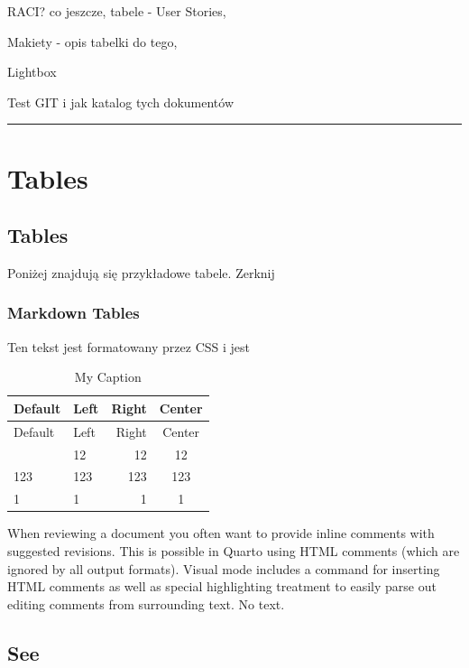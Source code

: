 \documentclass[
  a4paper,
  DIV=11,
  numbers=noendperiod,
  oneside,
  open=any]{scrreprt}
\begin{document}
RACI? co jeszcze, tabele - User Stories,

Makiety - opis tabelki do tego,

Lightbox

Test GIT i jak katalog tych dokumentów

\begin{center}\rule{0.5\linewidth}{0.5pt}\end{center}


\chapter{Tables}\label{tables}

\section{Tables}\label{tables-1}

Poniżej znajdują się przykładowe tabele. Zerknij

\subsection{Markdown Tables}\label{markdown-tables}

Ten tekst jest formatowany przez CSS i jest

\begin{longtable}[]{@{}llrc@{}}
\caption{My Caption}\label{tbl-letters}\tabularnewline
\toprule\noalign{}
Default & Left & Right & Center \\
\midrule\noalign{}
\endfirsthead
\toprule\noalign{}
Default & Left & Right & Center \\
\midrule\noalign{}
\endhead
\bottomrule\noalign{}
\endlastfoot
12 & 12 & 12 & 12 \\
123 & 123 & 123 & 123 \\
1 & 1 & 1 & 1 \\
\end{longtable}

When reviewing a document you often want to provide inline comments with
suggested revisions. This is possible in Quarto using HTML comments
(which are ignored by all output formats). Visual mode includes a
command for inserting HTML comments as well as special highlighting
treatment to easily parse out editing comments from surrounding text. No
text.

\section{See}\label{see}
\end{document}
